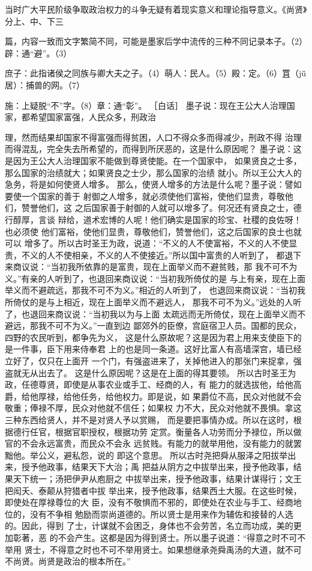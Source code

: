 \documentclass[12pt,UTF8]{ctexbook}
\begin{document}
当时广大平民阶级争取政治权力的斗争无疑有着现实意义和理论指导意义。《尚贤》分上、中、下三 

篇，内容一致而文字繁简不同，可能是墨家后学中流传的三种不同记录本子。（2）辟：通“避”。（3） 

庶子：此指诸侯之同族与卿大夫之子。（4）萌人：民人。（5）殿：定。（6）罝（jǖ居）：捕兽的网。（7） 

施：上疑脱“不”字。（8）章：通“彰”。 
［白话］ 
墨子说：现在王公大人治理国家，都希望国家富强，人民众多，刑政治 

理，然而结果却国家不得富强而得贫困，人口不得众多而得减少，刑政不得 
治理而得混乱，完全失去所希望的，而得到所厌恶的，这是什么原因呢？ 
墨子说：这是因为王公大人治理国家不能做到尊贤使能。在一个国家中， 
如果贤良之士多，那么国家的治绩就大；如果贤良之士少，那么国家的治绩 
就小。所以王公大人的急务，将是如何使贤人增多。 
那么，使贤人增多的方法是什么呢？墨子说：譬如要使一个国家的善于 
射御之人增多，就必须使他们富裕，使他们显贵，尊敬他们，赞誉他们，这 
之后国家善于射御的人就可以增多了。何况还有贤良之士，德行醇厚，言谈 
辩给，道术宏博的人呢！他们确实是国家的珍宝、社稷的良佐呀！也必须使 
他们富裕，使他们显贵，尊敬他们，赞誉他们，这之后国家的良士也就可以 
增多了。所以古时圣王为政，说道：“不义的人不使富裕，不义的人不使显 
贵，不义的人不使相亲，不义的人不使接近。”所以国中富贵的人听到了， 
都退下来商议说：“当初我所依靠的是富贵，现在上面举义而不避贫贱，那 
我不可不为义。”有亲的人听到了，也退回来商议说：“当初我所倚仗的是 
与上有亲，现在上面举义而不避疏远，那我不可不为义。”相近的人听到了， 
也退回来商议说：“当初我所倚仗的是与上相近，现在上面举义而不避远人， 
那我不可不为义。”远处的人听了，也退回来商议说：“当初我以为与上面 
太疏远而无所倚仗，现在上面举义而不避远，那我不可不为义。”一直到边 
鄙郊外的臣僚，宫庭宿卫人员。国都的民众，四野的农民听到，都争先为义， 
这是什么原故呢？这是因为君上用来支使臣下的是一件事，臣下用来侍奉君 
上的也是同一条道。这好比富人有高墙深宫，墙已经立好了，仅只在上面开 
一个门，有强盗进来了，关掉他进入的那张门来捉拿，强盗就无从出去了。 
这是什么原因呢？这是在上面的得其要领。 
所以古时圣王为政，任德尊贤，即使是从事农业或手工、经商的人，有 
能力的就选拔他，给他高爵，给他厚禄，给他任务，给他权力。即是说，如 
果爵位不高，民众对他就不会敬重；俸禄不厚，民众对他就不信任；如果权 
力不大，民众对他就不畏惧。拿这三种东西给贤人，并不是对贤人予以赏赐， 
而是要把事情办成。所以在这时，根据德行任官，根据官职授权，根据功劳 
定赏。衡量各人功劳而分予禄位，所以做官的不会永远富贵，而民众不会永 
远贫贱。有能力的就举用他，没有能力的就罢黜他。举公义，避私怨，说的 
即这个意思。 
所以古时尧把舜从服泽之阳拔举出来，授予他政事，结果天下大治；禹 
把益从阴方之中拔举出来，授予他政事，结果天下统一；汤把伊尹从庖厨之 
中拔举出来，授予他政事，结果计谋得行；文王把闳夭、泰颠从狩猎者中拔 
举出来，授予他政事，结果西土大服。在这些时候，即使处在厚禄尊位的大 
臣，没有不敬惧而不邪的，即使处在农业与手工、经商地位的，没有不争相 
勉励而崇尚道德的。所以贤士是用来作为辅佐和接替的人选的。因此，得到 
了士，计谋就不会困乏，身体也不会劳苦，名立而功成，美的更加彰著，恶 
的不会产生。这都是因为得到贤士。所以墨子说道：“得意之时不可不举用 
贤士，不得意之时也不可不举用贤士。如果想继承尧舜禹汤的大道，就不可 
不尚贤。尚贤是政治的根本所在。” 
\end{document}
